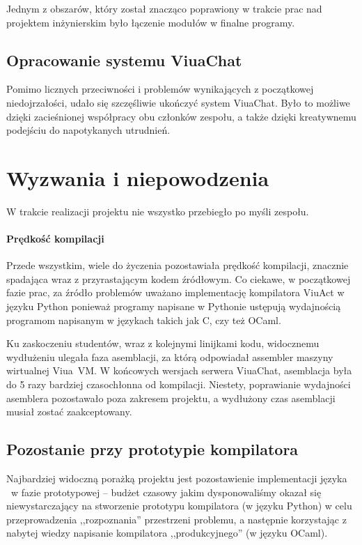 Jednym z obszarów, który został znacząco poprawiony w trakcie prac nad
projektem inżynierskim było łączenie modułów w finalne programy.

\subsection{Opracowanie systemu ViuaChat}
Pomimo licznych przeciwności i problemów wynikających z początkowej niedojrzałości, udało się szczęśliwie ukończyć system ViuaChat. Było to
możliwe dzięki zacieśnionej współpracy obu członków zespołu, a także dzięki
kreatywnemu podejściu do napotykanych utrudnień.

\section{Wyzwania i niepowodzenia}

W trakcie realizacji projektu nie wszystko przebiegło po myśli zespołu.

\paragraph*{Prędkość kompilacji}

Przede wszystkim, wiele do życzenia pozostawiała prędkość kompilacji, znacznie
spadająca wraz z przyrastającym kodem źródłowym. Co ciekawe, w początkowej fazie
prac, za źródło problemów uważano implementację kompilatora ViuAct w języku
Python ponieważ programy napisane w Pythonie ustępują wydajnością programom
napisanym w językach takich jak C, czy też OCaml.

Ku zaskoczeniu studentów, wraz z kolejnymi linijkami kodu, widocznemu wydłużeniu
ulegała faza asemblacji, za którą odpowiadał assembler maszyny wirtualnej
Viua~VM. W końcowych wersjach serwera ViuaChat, asemblacja była do 5 razy
bardziej czasochłonna od kompilacji. Niestety, poprawianie wydajności asemblera
pozostawało poza zakresem projektu, a wydłużony czas asemblacji musiał zostać
zaakceptowany.

\subsection{Pozostanie przy prototypie kompilatora}

Najbardziej widoczną porażką projektu jest pozostawienie implementacji języka
\ViuAct\ w fazie prototypowej -- budżet czasowy jakim dysponowaliśmy okazał się
niewystarczający na stworzenie prototypu kompilatora (w języku Python) w celu
przeprowadzenia ,,rozpoznania'' przestrzeni problemu, a następnie korzystając z
nabytej wiedzy napisanie kompilatora ,,produkcyjnego'' (w języku OCaml).


